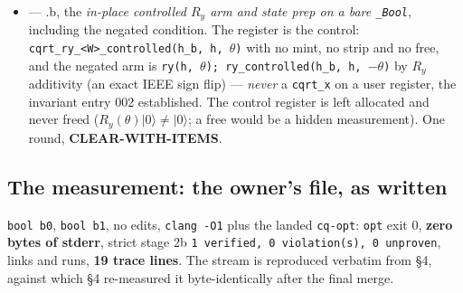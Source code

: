 \begin{itemize}
    (measured 32/32). One round, \textbf{CLEAR-WITH-ITEMS}.
  \item {} --- .b, the \emph{in-place controlled \(R_y\) arm and state prep on a
    bare \texttt{\_Bool}}, including the negated condition. The register is the control:
    \texttt{cqrt\_ry\_<W>\_controlled(h\_b, h, \(\theta\))} with no mint, no strip and no free, and the
    negated arm is \texttt{ry(h, \(\theta\)); ry\_controlled(h\_b, h, \(-\theta\))} by \(R_y\) additivity
    (an exact IEEE sign flip) --- \emph{never} a \texttt{cqrt\_x} on a user register, the invariant entry
    002 established. The control register is left allocated and never freed (\(R_y(\theta)|0\rangle \neq
    |0\rangle\); a free would be a hidden measurement). One round, \textbf{CLEAR-WITH-ITEMS}.
\end{itemize}

\subsection*{The measurement: the owner's file, as written}
\texttt{bool b0}, \texttt{bool b1}, no edits, \texttt{clang -O1} plus the landed \texttt{cq-opt}:
\texttt{opt} exit 0, \textbf{zero bytes of stderr}, strict stage 2b \texttt{1 verified, 0 violation(s),
0 unproven}, links and runs, \textbf{19 trace lines}. The stream is reproduced verbatim from
 \S4, against which  \S4 re-measured it
byte-identically after the final merge.

